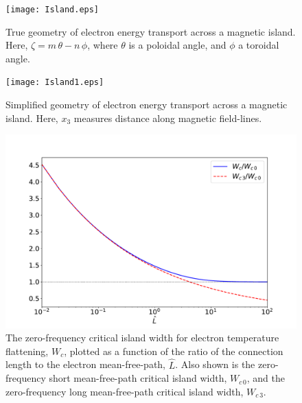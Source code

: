 \documentclass[12pt,prb,aps]{revtex4-1}
\begin{document}
\newpage
\begin{figure}
\centerline{\texttt{[image: Island.eps]}}
\caption{True geometry of electron energy transport across a magnetic island. Here, $\zeta= m\,\theta-n\,\phi$, where $\theta$ is a poloidal angle, and $\phi$ a
toroidal angle.  \label{fig1}}
\end{figure}

\begin{figure}
\centerline{\texttt{[image: Island1.eps]}}
\caption{Simplified geometry of electron energy transport across a magnetic island. Here, $x_3$ measures distance along magnetic field-lines.  \label{fig2}}
\end{figure}

\begin{figure}
\centerline{\includegraphics[width=1.0\textwidth]{zero.pdf}}
\caption{ The zero-frequency critical island width for electron temperature flattening, $W_c$, plotted as a function of the ratio of the connection length to the electron
mean-free-path, $\hat{L}$.
Also shown is the zero-frequency short mean-free-path critical island width, $W_{c\,0}$, and the zero-frequency long mean-free-path
critical island width, $W_{c\,3}$.\label{fig3}}
\end{figure}
\end{document}
